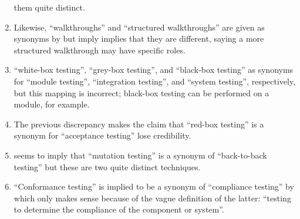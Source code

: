 \begin{enumerate}
          them quite distinct.
    \item %
           \label{walkthrough-syns}
          Likewise, ``walkthroughs'' and ``structured walkthroughs'' are given
          as synonyms by \citetISTQB{} but \citet[p.~484]{PetersAndPedrycz2000}
          \ifnotpaper imply \else implies \fi that they are different, saying a
          more structured walkthrough may have specific roles.
          \ifnotpaper
    \item %
           \citet[p.~18]{SneedAndGöschl2000}
           ``white-box testing'', ``grey-box testing'',
          and ``black-box testing'' as synonyms for ``module testing'',
          ``integration testing'', and ``system testing'', respectively, but
          this mapping is incorrect; black-box testing can be performed on a
          module, for example.
    \item %
          The previous discrepancy makes the claim that
          ``red-box testing'' is a synonym for ``acceptance testing''
          \citep[p.~18]{SneedAndGöschl2000} lose credibility.
    \item %
           \citet[p.~46]{Kam2008} seems to imply that ``mutation
          testing'' is a synonym of ``back-to-back testing''
          but these are two quite distinct techniques.
    \item %
          ``Conformance testing'' is implied to be a synonym of ``compliance
          testing'' by \citet[p.~43]{Kam2008} which only makes sense because
          of the vague definition of the latter: ``testing to
          determine the compliance of the component or system''. \fi
\end{enumerate}